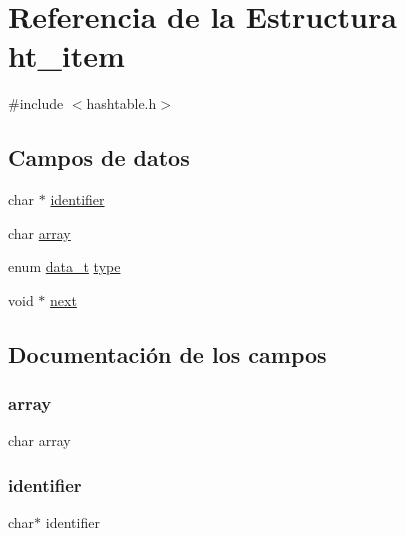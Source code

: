 \hypertarget{structht__item}{}\section{Referencia de la Estructura ht\+\_\+item}
\label{structht__item}


{\ttfamily \#include $<$hashtable.\+h$>$}

\subsection*{Campos de datos}
\begin{DoxyCompactItemize}
\item 
char $\ast$ \mbox{\hyperlink{structht__item_af5351a0143adaf16c64b881aee01d893}{identifier}}
\item 
char \mbox{\hyperlink{structht__item_a76224348fd73cd6ef63a09ed36b0728b}{array}}
\item 
enum \mbox{\hyperlink{hashtable_8h_adb5f3584b941a8dc0fed6b7302b4b8eb}{data\+\_\+t}} \mbox{\hyperlink{structht__item_a0c6169f5c94682132bbbe974784559e6}{type}}
\item 
void $\ast$ \mbox{\hyperlink{structht__item_a75b19ffcca77bfc647ff02695958fd95}{next}}
\end{DoxyCompactItemize}


\subsection{Documentación de los campos}
\mbox{\label{structht__item_a76224348fd73cd6ef63a09ed36b0728b}} 
\subsubsection{\texorpdfstring{array}{array}}
{\footnotesize\ttfamily char array}

\mbox{\label{structht__item_af5351a0143adaf16c64b881aee01d893}} 
\subsubsection{\texorpdfstring{identifier}{identifier}}
{\footnotesize\ttfamily char$\ast$ identifier}

